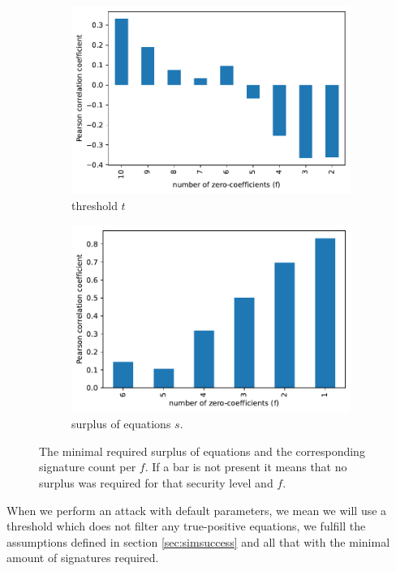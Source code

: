 \begin{figure}%
	\centering%
	\begin{subfigure}{.5\textwidth}%
		\centering%
		\includegraphics[width=.95\linewidth]{plots/threshold_correlation}%
		\caption{threshold $t$}%
		\label{fig:corrthreshold}%
	\end{subfigure}%
	\begin{subfigure}{.5\textwidth}%
		\centering%
		\includegraphics[width=.95\linewidth]{plots/surplus_correlation}%
		\caption{surplus of equations $s$.}%
		\label{fig:corrsurplus}%
	\end{subfigure}%
%
	\caption{The minimal required surplus of equations and the corresponding signature count per $f$. If a bar is not present it means that no surplus was required for that security level and $f$.}
	\label{fig:corrs}%
\end{figure}




When we perform an attack with default parameters, we mean we will use a threshold which does not filter any true-positive equations, we fulfill the assumptions defined in section \ref{sec:simsuccess} and all that with the minimal amount of signatures required.



